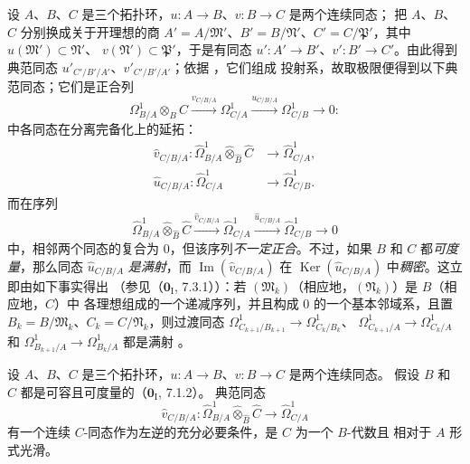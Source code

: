 \begin{env}[20.7.17]
\label{0.20.7.17-fr}
设 $A$、$B$、$C$ 是三个拓扑环，$u:A\to B$、$v:B\to C$ 是两个连续同态；
把 $A$、$B$、$C$ 分别换成关于开理想的商
$A'=A/\mathfrak{M}'$、$B'=B/\mathfrak{N}'$、$C'=C/\mathfrak{P}'$，其中
$u(\mathfrak{M}')\subset\mathfrak{N}'$、
$v(\mathfrak{N}')\subset\mathfrak{P}'$，于是有同态
$u':A'\to B'$、$v':B'\to C'$。由此得到典范同态
$u'_{C'/B'/A'}$、$v'_{C'/B'/A'}$；依据 ，它们组成
投射系，故取极限便得到以下典范同态；它们是正合列
\[
  \Omega^1_{B/A}\otimes_B C\xrightarrow{v_{C/B/A}}\Omega^1_{C/A}
  \xrightarrow{u_{C/B/A}}\Omega^1_{C/B}\to0:
\]
中各同态在分离完备化上的延拓：
\begin{align}
  \widehat v_{C/B/A}:\widehat{\Omega}^1_{B/A}
  \widehat\otimes_{\widehat B}\widehat C&\to\widehat{\Omega}^1_{C/A},
  \tag{20.7.17.1}\label{0.20.7.17.1-fr}\\
  \widehat u_{C/B/A}:\widehat{\Omega}^1_{C/A}&\to
  \widehat{\Omega}^1_{C/B}. \tag{20.7.17.2}\label{0.20.7.17.2-fr}
\end{align}
而在序列
\begin{equation}
\tag{20.7.17.3}
\label{0.20.7.17.3-fr}
  \widehat{\Omega}^1_{B/A}\widehat\otimes_{\widehat B}\widehat C
  \xrightarrow{\widehat v_{C/B/A}}\widehat{\Omega}^1_{C/A}
  \xrightarrow{\widehat u_{C/B/A}}\widehat{\Omega}^1_{C/B}\to0
\end{equation}
中，相邻两个同态的复合为 $0$，但该序列\emph{不一定正合}。不过，如果 $B$
和 $C$ 都\emph{可度量}，那么同态 $\widehat u_{C/B/A}$ \emph{是满射}，而
$\operatorname{Im}(\widehat v_{C/B/A})$ 在
$\operatorname{Ker}(\widehat u_{C/B/A})$ 中\emph{稠密}。这立即由如下事实得出
（参见（$\mathbf{0}_{\mathrm I}$, 7.3.1））：若
$(\mathfrak{M}_k)$（相应地，$(\mathfrak{N}_k)$）是 $B$（相应地，$C$）中
各理想组成的一个递减序列，并且构成 $0$ 的一个基本邻域系，且置
$B_k=B/\mathfrak{M}_k$、$C_k=C/\mathfrak{N}_k$，则过渡同态
$\Omega^1_{C_{k+1}/B_{k+1}}\to\Omega^1_{C_k/B_k}$、
$\Omega^1_{C_{k+1}/A}\to\Omega^1_{C_k/A}$ 和
$\Omega^1_{B_{k+1}/A}\to\Omega^1_{B_k/A}$ 都是满射
。
\end{env}

\begin{proposition}[20.7.18]
\label{0.20.7.18-fr}
设 $A$、$B$、$C$ 是三个拓扑环，$u:A\to B$、$v:B\to C$ 是两个连续同态。
假设 $B$ 和 $C$ 都是可容且可度量的（$\mathbf{0}_{\mathrm I}$, 7.1.2）。
典范同态
\[
  \widehat v_{C/B/A}:\widehat{\Omega}^1_{B/A}
  \widehat\otimes_{\widehat B}\widehat C\to\widehat{\Omega}^1_{C/A}
\]
有一个连续 $C$-同态作为左逆的充分必要条件，是 $C$ 为一个 $B$-代数且
相对于 $A$ 形式光滑。
\end{proposition}

